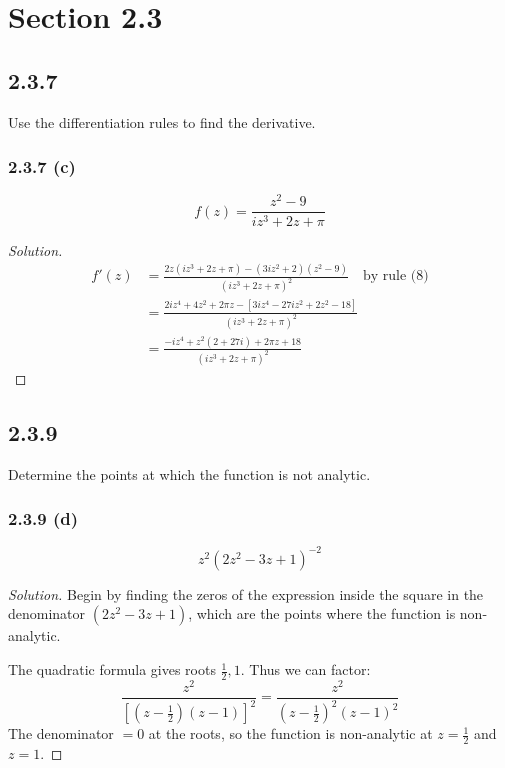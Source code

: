 \documentclass{article}
\newenvironment{solution}{
\begin{proof}[Solution]}{
\end{proof}}
\begin{document}
\section*{Section 2.3}

\subsection*{2.3.7}
Use the differentiation rules to find the derivative.

\subsubsection*{2.3.7 (c)}
\[
  f(z) = \frac{z^2 - 9}{iz^3 + 2z + \pi}
\]
\begin{solution}
  \begin{align*}
    f'(z)
    &= \frac{2z\left(iz^3 + 2z + \pi\right) - \left(3iz^2 + 2\right)\left(z^2 - 9\right)}{\left(iz^3 + 2z + \pi\right)^2} \quad \text{by rule (8)}
    \\ &= \frac{2iz^4 + 4z^2 + 2\pi z - \left[3iz^4 - 27iz^2 + 2z^2 - 18\right]}{\left(iz^3 + 2z + \pi\right)^2}
    \\ &= \frac{-iz^4 + z^2(2 + 27i) + 2\pi z + 18}{\left(iz^3 + 2z + \pi\right)^2}
  \end{align*}
\end{solution}

\subsection*{2.3.9}
Determine the points at which the function is not analytic.

\subsubsection*{2.3.9 (d)}
\[
  z^2\left(2z^2 - 3z + 1\right)^{-2}
\]
\begin{solution}
  Begin by finding the zeros of the expression inside the square in the denominator
  $(2z^2 - 3z + 1)$, which are the points where the function is non-analytic.

  The quadratic formula gives roots $\frac{1}{2}, 1$. Thus we can factor:
  \[
    \frac{z^2}{\left[\left(z - \frac{1}{2}\right)(z - 1)\right]^2}
    = \frac{z^2}{\left(z - \frac{1}{2}\right)^2(z - 1)^2}
  \]
  The denominator $= 0$ at the roots, so the function is non-analytic at
  $z = \frac{1}{2}$ and $z = 1$.
\end{solution}
\end{document}
